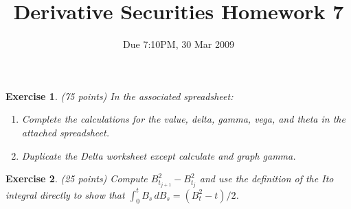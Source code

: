 \documentclass[11pt,fleqn]{amsproc}
\newtheorem{xca}{Exercise}
\begin{document}
\title{Derivative Securities Homework 7}
\author{Due 7:10PM, 30 Mar 2009}

\maketitle

\begin{xca}{(75 points)}
In the associated spreadsheet:
\begin{enumerate}
\item Complete the calculations for the value, delta, gamma, vega, and theta in the attached spreadsheet.
\item Duplicate the Delta worksheet except calculate and graph gamma.
\end{enumerate}
\end{xca}

\begin{xca}{(25 points)}
Compute $B_{t_{j+1}}^2 - B_{t_j}^2$ and use the definition of the Ito integral directly
to show that $\int_0^t B_s\,dB_s = (B_t^2 - t)/2$.
\end{xca}
\end{document}
